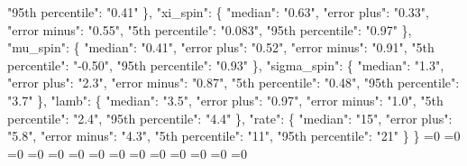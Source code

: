{{        "95th percentile": "0.41"%
      \}, %
      "xi\_spin": \{%
        "median": "0.63", %
        "error plus": "0.33", %
        "error minus": "0.55", %
        "5th percentile": "0.083", %
        "95th percentile": "0.97"%
      \}, %
      "mu\_spin": \{%
        "median": "0.41", %
        "error plus": "0.52", %
        "error minus": "0.91", %
        "5th percentile": "{-}0.50", %
        "95th percentile": "0.93"%
      \}, %
      "sigma\_spin": \{%
        "median": "1.3", %
        "error plus": "2.3", %
        "error minus": "0.87", %
        "5th percentile": "0.48", %
        "95th percentile": "3.7"%
      \}, %
      "lamb": \{%
        "median": "3.5", %
        "error plus": "0.97", %
        "error minus": "1.0", %
        "5th percentile": "2.4", %
        "95th percentile": "4.4"%
      \}, %
      "rate": \{%
        "median": "15", %
        "error plus": "5.8", %
        "error minus": "4.3", %
        "5th percentile": "11", %
        "95th percentile": "21"%
      \}%
    \}}%
  \else%
    \ifnum{}=0%
      \let\PowerLawTwoPeakOneBBH@out\PowerLawTwoPeakOneBBH@I%
    \else%
      \ifnum{}=0%
      \let\PowerLawTwoPeakOneBBH@out\PowerLawTwoPeakOneBBH@II%
    \else%
      \ifnum{}=0%
      \let\PowerLawTwoPeakOneBBH@out\PowerLawTwoPeakOneBBH@III%
    \else%
      \ifnum{}=0%
      \let\PowerLawTwoPeakOneBBH@out\PowerLawTwoPeakOneBBH@IV%
    \else%
      \ifnum{}=0%
      \let\PowerLawTwoPeakOneBBH@out\PowerLawTwoPeakOneBBH@V%
    \else%
      \ifnum{}=0%
      \let\PowerLawTwoPeakOneBBH@out\PowerLawTwoPeakOneBBH@VI%
    \else%
      \ifnum{}=0%
      \let\PowerLawTwoPeakOneBBH@out\PowerLawTwoPeakOneBBH@VII%
    \else%
      \ifnum{}=0%
      \let\PowerLawTwoPeakOneBBH@out\PowerLawTwoPeakOneBBH@VIII%
    \else%
      \ifnum{}=0%
      \let\PowerLawTwoPeakOneBBH@out\PowerLawTwoPeakOneBBH@IX%
    \else%
      \ifnum{}=0%
      \let\PowerLawTwoPeakOneBBH@out\PowerLawTwoPeakOneBBH@X%
    \else%
      \ifnum{}=0%
      \let\PowerLawTwoPeakOneBBH@out\PowerLawTwoPeakOneBBH@XI%
    \else%
      \ifnum{}=0%
      \let\PowerLawTwoPeakOneBBH@out\PowerLawTwoPeakOneBBH@XII%
    \else%
      \ifnum{}=0%
      \let\PowerLawTwoPeakOneBBH@out\PowerLawTwoPeakOneBBH@XIII%
    \else%
      \ifnum{}=0%
      \let\PowerLawTwoPeakOneBBH@out\PowerLawTwoPeakOneBBH@XIV%
}

